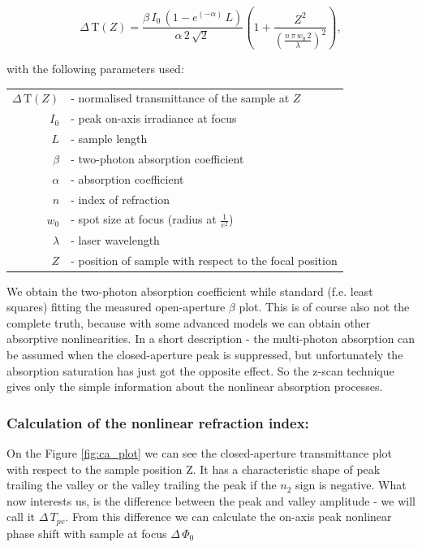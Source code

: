\documentclass[12pt,twoside,a4paper]{article}
\numberwithin{equation}{subsection}
\numberwithin{figure}{subsection}
\begin{document}
\begin{equation}
  \Delta \,\mathrm{T}(Z)=\frac {\beta \,{I_{0}}\,(1 - e^{( - \alpha )}\,L)}{\alpha \,2\,\sqrt{2}\,} 
  \left(  \! 1 + \frac {Z^{2}}{(\frac {n\,\pi \,{w_{0}}\,2}{\lambda })^{2}} \!  \right) ,
\end{equation}
 
with the following parameters used: 

\begin{tabular}{ r l }
   $\Delta \,\mathrm{T}(Z)$ & - normalised transmittance of the sample at $Z$ \\
   ${I_{0}}$ & - peak on-axis irradiance at focus \\
   $L$ & - sample length \\
   $\beta $ & - two-photon absorption coefficient \\
   $\alpha $ & - absorption coefficient \\
   $n$ & - index of refraction \\
   ${w_{0}}$ & - spot size at focus (radius at $\frac {1}{e^{2}}$) \\
   $\lambda $ & - laser wavelength \\
   $Z$ & - position of sample with respect to the focal position \\
\end{tabular}

We obtain the two-photon absorption coefficient while standard (f.e. least squares) fitting the measured open-aperture $\beta $ 
plot. This is of course also not the complete truth, because with some advanced models we can obtain other absorptive
nonlinearities. In a short description - the multi-photon absorption can be assumed when the closed-aperture peak is suppressed,
but unfortunately the absorption saturation has just got the opposite effect. So the z-scan technique gives only the simple
information about the nonlinear absorption processes.

\subsubsection*{Calculation of the nonlinear refraction index:}

On the Figure \ref{fig:ca_plot} we can see the closed-aperture transmittance plot with respect to the sample position Z. It has a
characteristic shape of peak trailing the valley or the valley trailing the peak if the ${n_{2}}$ sign is negative. What now
interests us, is the difference between the peak and valley amplitude - we will call it $\Delta \,{T_{pv}}$. From this difference
we can calculate the on-axis peak nonlinear phase shift with sample at focus $\Delta \,{\Phi_{0}}$
\end{document}
